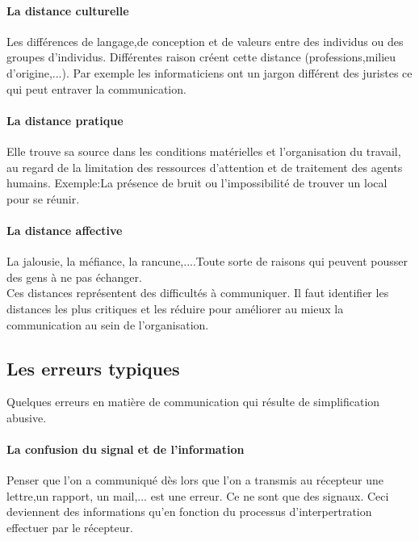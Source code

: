 \documentclass[11pt]{article} %
\begin{document}
		\paragraph{La distance culturelle} Les différences de langage,de conception et de valeurs entre des 	
		individus ou des groupes d'individus. Différentes raison créent cette distance (professions,milieu 
		d'origine,...). Par exemple les informaticiens ont un jargon différent des juristes ce qui peut entraver la 
		communication.
		\paragraph{La distance pratique} Elle trouve sa source dans les conditions matérielles et l'organisation
		du travail, au regard de la limitation des ressources d'attention et de traitement des agents humains. 
		Exemple:La présence de bruit ou l'impossibilité de trouver un local pour se réunir.
		\paragraph{La distance affective} La jalousie, la méfiance, la rancune,....Toute sorte de raisons qui 
		peuvent pousser des gens à ne pas échanger.\\
		Ces distances représentent des difficultés à communiquer. Il faut identifier les distances les plus 
		critiques et les réduire pour améliorer au mieux la communication au sein de l'organisation.
	\subsection{Les erreurs typiques}
		Quelques erreurs en matière de communication qui résulte de simplification abusive.
		\paragraph{La confusion du signal et de l'information} Penser que l'on a communiqué dès lors que 
		l'on a transmis au récepteur une lettre,un rapport, un mail,... est une erreur. Ce ne sont que des 
		signaux. Ceci deviennent des informations qu'en fonction du processus d'interpertration effectuer par 
		le récepteur.
\end{document}
